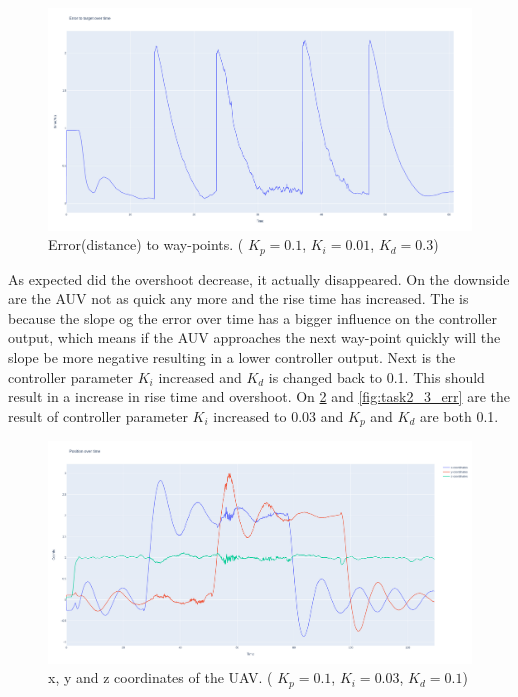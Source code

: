 \documentclass[conference]{IEEEtran}
\begin{document}
\begin{figure}[hbtp]
	\centering
	\includegraphics[width=1.0\linewidth]{images/task2_4_err.png}
	\caption{Error(distance) to way-points. ( $K_p = 0.1$, $K_i = 0.01$, $K_d = 0.3$)}
	\label{fig:task2_4_err}
\end{figure}

As expected did the overshoot decrease, it actually disappeared. On the downside are the AUV not as quick any more and the rise time has increased. The is because the slope og the error over time has a bigger influence on the controller output, which means if the AUV approaches the next way-point quickly will the slope be more negative resulting in a lower controller output. 
Next is the controller parameter $K_i$ increased and $K_d$ is changed back to 0.1. This should result in a increase in rise time and overshoot. On \cref{fig:task2_3_pos} and \cref{fig:task2_3_err} are the result of controller parameter $K_i$ increased to 0.03 and $K_p$ and $K_d$ are both 0.1. 

\begin{figure}[hbtp]
	\centering
	\includegraphics[width=1.0\linewidth]{images/task2_3_pos.png}
	\caption{x, y and z coordinates of the UAV. ( $K_p = 0.1$, $K_i = 0.03$, $K_d = 0.1$)}
	\label{fig:task2_3_pos}
\end{figure}
\end{document}
